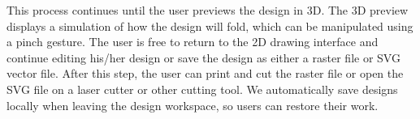 This process continues until the user previews the design in 3D. The 3D
preview displays a simulation of how the design will fold, which can be
manipulated using a pinch gesture. The user is free to return to the 2D
drawing interface and continue editing his/her design or save the design
as either a raster file or SVG vector file. After this step, the user
can print and cut the raster file or open the SVG file on a laser cutter
or other cutting tool. We automatically save designs locally when
leaving the design workspace, so users can restore their work.
